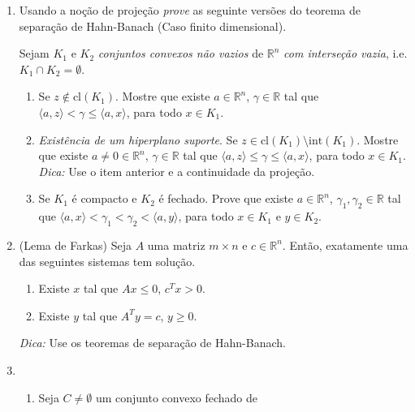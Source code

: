 \documentclass[a4paper,latin]{article}
\begin{document}
    \begin{enumerate}
    \item Usando a noção de projeção {\it prove} as seguinte versões 
    do teorema de separação de Hahn-Banach (Caso finito dimensional).
     
    Sejam $K_1$ e $K_{2}$ {\it conjuntos convexos não vazios} 
    de $\mathbb{R}^{n}$ {\it com 
    interseção vazia}, i.e.
    $K_{1}\cap K_2=\emptyset$. 
        \begin{enumerate}
        \item Se $z \notin \text{cl}(K_1)$. Mostre que 
        existe $a \in \mathbb{R}^{n}$, 
        $\gamma \in \mathbb{R}$
        tal que $\langle a, z \rangle < 
        \gamma \leq \langle a, x \rangle$, 
        para todo $x \in K_1$.
        \item {\it Existência de um hiperplano suporte}. 
        Se $z \in \text{cl}(K_1)\setminus \text{int}(K_1)$. Mostre que 
        existe $a\neq 0 \in \mathbb{R}^{n}$, 
        $\gamma \in \mathbb{R}$
        tal que $\langle a, z \rangle \leq \gamma \leq \langle a, x \rangle$, 
        para todo $x \in K_1$.
        {\it Dica: } Use o item anterior e a continuidade da projeção.
        \item Se $K_1$ é compacto e $K_2$ é fechado. 
        Prove que 
        existe $a \in \mathbb{R}^{n}$, 
        $\gamma_1, \gamma_2 \in \mathbb{R}$
        tal que $\langle a, x \rangle < 
        \gamma_1<\gamma_2 <\langle a, y \rangle$, 
        para todo $x \in K_1$ e $y \in K_2$. 
        \end{enumerate}
    \item (Lema de Farkas)
    Seja $A$ uma matriz 
    $m \times n$ e 
    $c \in \mathbb{R}^{n}$. 
    Então, exatamente uma das seguintes sistemas tem solução.
      \begin{enumerate}
      \item 
      Existe $x$ tal que 
      $Ax\leq 0$, $c^{T}x>0$.
      \item       
      Existe $y$ tal que 
      $A^{T}y=c$, $y \geq 0$.
      \end{enumerate}
    {\it Dica:} Use os teoremas de separação de Hahn-Banach.  
    \item 
       \begin{enumerate}
       	\item Seja $C\neq \emptyset$ um conjunto convexo fechado de 

\end{enumerate}
\end{enumerate}
\end{document}
